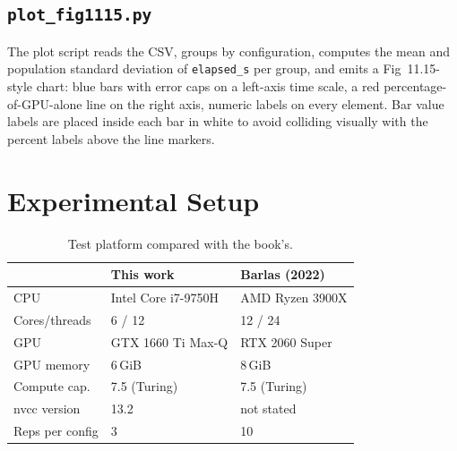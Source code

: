 \documentclass[
	english,
	letterpaper, oneside
]{article}
\begin{document}
\subsection{\texttt{plot\_fig1115.py}}

The plot script reads the CSV, groups by configuration, computes the
mean and population standard deviation of \texttt{elapsed\_s} per group,
and emits a Fig~11.15-style chart: blue bars with error caps on a
left-axis time scale, a red percentage-of-GPU-alone line on the right
axis, numeric labels on every element. Bar value labels are placed
inside each bar in white to avoid colliding visually with the
percent labels above the line markers.


\section{Experimental Setup}

\begin{table}[H]
    \centering
    \caption{Test platform compared with the book's.}
    \label{tab:hw}
    \begin{tabular}{lll}
        \hline
        & This work & Barlas (2022) \\
        \hline
        CPU            & Intel Core i7-9750H        & AMD Ryzen 3900X \\
        Cores/threads  & 6 / 12                     & 12 / 24 \\
        GPU            & GTX 1660 Ti Max-Q          & RTX 2060 Super \\
        GPU memory     & 6\,GiB                     & 8\,GiB \\
        Compute cap.   & 7.5 (Turing)               & 7.5 (Turing) \\
        nvcc version   & 13.2                       & not stated \\
        Reps per config & 3                         & 10 \\
        \hline
    \end{tabular}
\end{table}
\end{document}
